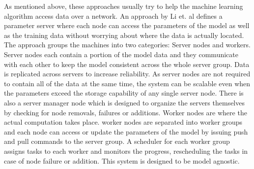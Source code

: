 \documentclass[11pt]{article}       %
\begin{document}
As mentioned above, these approaches usually try to help the machine learning algorithm access data over a network. An approach by Li et. al\cite{Li2014} defines a parameter server where each node can access the parameters of the model as well as the training data without worrying about where the data is actually located. The approach groups the machines into two categories: Server nodes and workers. Server nodes each contain a portion of the model data and they communicate with each other to keep the model consistent across the whole server group. Data is replicated across servers to increase reliability. As server nodes are not required to contain all of the data at the same time, the system can be scalable even when the parameters exceed the storage capability of any single server node. There is also a server manager node which is designed to organize the servers themselves by checking for node removals, failures or additions.
Worker nodes are where the actual computation takes place. worker nodes are separated into worker groups and each node can access or update the parameters of the model by issuing push and pull commands to the server group. A scheduler for each worker group assigns tasks to each worker and monitors the progress, rescheduling the tasks in case of node failure or addition. This system is designed to be model agnostic.



% 

\printbibliography
\end{document}
